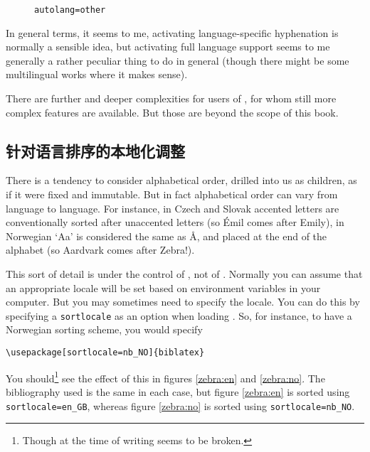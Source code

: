 \begin{figure}
\caption{\texttt{autolang=other}\label{proust2}}
\end{figure}

In general terms, it seems to me, activating language-specific
hyphenation is normally a sensible idea, but activating full language
support seems to me generally a rather peculiar thing to do in general
(though there might be some multilingual works where it makes sense).

There are further and deeper complexities for users of
, for whom still more complex features are
available. But those are beyond the scope of this book.

\subsection{针对语言排序的本地化调整}

There is a tendency to consider alphabetical order, drilled into us as
children, as if it were fixed and immutable. But in fact alphabetical
order can vary from language to language. For instance, in Czech and
Slovak accented letters are conventionally sorted after unaccented
letters (so \'{E}mil comes after Emily), in Norwegian `Aa' is
considered the same as \r{A}, and placed at the end of the alphabet
(so Aardvark comes after Zebra!).

This sort of detail is under the control of , not of
\biblatex. Normally you can assume that an appropriate locale will be
set based on environment variables in your computer. But you may
sometimes need to specify the locale. You can do this by specifying a
\texttt{sortlocale} as an option when loading \biblatex. So, for
instance, to have a Norwegian sorting scheme, you would specify
\begin{verbatim}
\usepackage[sortlocale=nb_NO]{biblatex}
\end{verbatim}

You should\footnote{Though at the time of writing 
  seems to be broken.} see the effect of this in figures
\ref{zebra:en} and \ref{zebra:no}. The bibliography used is the same
in each case, but figure \ref{zebra:en} is sorted using
\texttt{sortlocale=en\_GB}, whereas figure \ref{zebra:no} is sorted
using \texttt{sortlocale=nb\_NO}.

